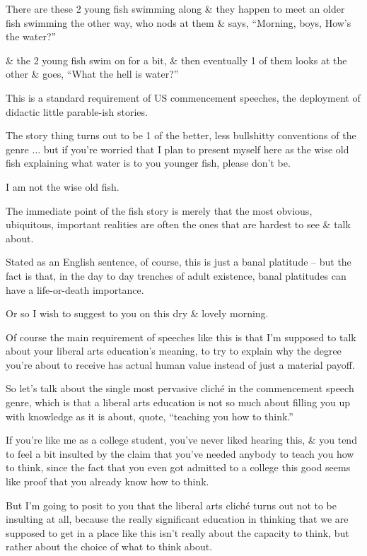 \documentclass{article}
\begin{document}
There are these 2 young fish swimming along \& they happen to meet an older fish swimming the other way, who nods at them \& says, ``Morning, boys, How's the water?''

\& the 2 young fish swim on for a bit, \& then eventually 1 of them looks at the other \& goes, ``What the hell is water?''

This is a standard requirement of US commencement speeches, the deployment of didactic little parable-ish stories.

The story thing turns out to be 1 of the better, less bullshitty conventions of the genre $\ldots$ but if you're worried that I plan to present myself here as the wise old fish explaining what water is to you younger fish, please don't be.

I am not the wise old fish.

The immediate point of the fish story is merely that the most obvious, ubiquitous, important realities are often the ones that are hardest to see \& talk about.

Stated as an English sentence, of course, this is just a banal platitude -- but the fact is that, in the day to day trenches of adult existence, banal platitudes can have a life-or-death importance.

Or so I wish to suggest to you on this dry \& lovely morning.

Of course the main requirement of speeches like this is that I'm supposed to talk about your liberal arts education's meaning, to try to explain why the degree you're about to receive has actual human value instead of just a material payoff.

So let's talk about the single most pervasive clich\'e in the commencement speech genre, which is that a liberal arts education is not so much about filling you up with knowledge as it is about, quote, ``teaching you how to think.''

If you're like me as a college student, you've never liked hearing this, \& you tend to feel a bit insulted by the claim that you've needed anybody to teach you how to think, since the fact that you even got admitted to a college this good seems like proof that you already know how to think.

But I'm going to posit to you that the liberal arts clich\'e turns out not to be insulting at all, because the really significant education in thinking that we are supposed to get in a place like this isn't really about the capacity to think, but rather about the choice of what to think about.
\end{document}
